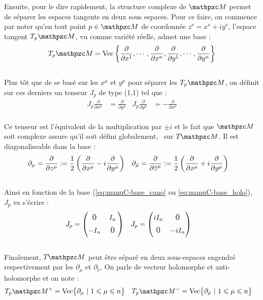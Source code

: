 \begin{annexe}
Ensuite, pour le dire rapidement, la structure complexe de $\manu$ permet de séparer les espaces tangents en deux sous espaces. Pour ce faire, on commence par noter qu'en tout point $p\in\manu$ de coordonnée $z^\nu=x^\nu+iy^\nu$, l'espace tangent $\tg[p]{\manu}$, vu comme variété réelle, admet une base :
\begin{equation}
	\tg[p]{\manu} = \vec \left\{ \frac{\partial}{\partial x^1}, \cdots, \frac{\partial}{\partial x^n}, \frac{\partial}{\partial y^1}, \cdots,  \frac{\partial}{\partial y^n} \right\}
\end{equation}
\\
Plus tôt que de se basé sur les $x^\mu$ et $y^\mu$ pour séparer les $\tg[p]{\manu}$, on définit sur ces derniers un tenseur $J_p$ de type (1,1) tel que :
\begin{align}
	J_p \frac{\partial}{\partial x^\mu} &= \frac{\partial}{\partial y^\mu}  &  J_p \frac{\partial}{\partial y^\mu} &= -\frac{\partial}{\partial x^\mu}
\end{align}
\\
Ce tenseur est l'équivalent de la multiplication par $\pm i$ et le fait que $\manu$ soit complexe assure qu'il soit défini globalement, \ie~sur $\tg{\manu}$. Il est diagonaliseable dans la base :
\begin{align}\label{eq:manuC-base_holo}
	\partial_\mu = \frac{\partial}{\partial z^\mu} &:= \frac{1}{2}\left( \frac{\partial}{\partial x^\mu} - i\frac{\partial}{\partial y^\mu} \right)  
	&  
	\partial_{\bar{\mu}} = \frac{\partial}{\partial \overline{z}^\mu} &:= \frac{1}{2}\left( \frac{\partial}{\partial x^\mu} + i\frac{\partial}{\partial y^\mu} \right)
\end{align}
\\
Ainsi en fonction de la base (\eqref{eq:manuC-base_cano} ou \eqref{eq:manuC-base_holo}), $J_p$ va s'écrire :
\begin{align}
	J_p &= \begin{pmatrix}
		\text{\large\ 0\ }\Big. & I_n \\ -I_n & \text{\large\ 0\ }\Big.
	\end{pmatrix}  &
	J_p &= \begin{pmatrix}
		iI_n & \text{\large\ 0\ }\Big. \\ \text{\large\ 0\ }\Big. & -iI_n
	\end{pmatrix} 
\end{align}
\\
Finalement, $\tg{\manu}$ peut être séparé en deux sous-espaces engendré respectivement par les $\partial_\mu$ et $\partial_{\bar{\nu}}$. On parle de vecteur holomorphe et anti-holomorphe et on note :
\begin{align}
	\tg[p]{\manu}^+ &= \Vec\big\{ \partial_\mu\ |\ 1\leq \mu\leq n \big\}  &  \tg[p]{\manu}^- &= \Vec\big\{ \partial_{\bar{\mu}}\ |\ 1\leq \mu\leq n \big\}
\end{align}

\end{annexe}


